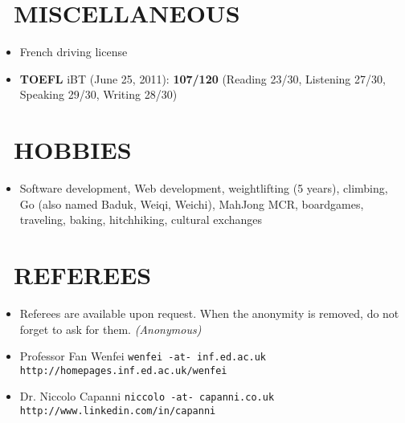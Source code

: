 \documentclass{res}
\begin{document}
\begin{resume}
\section{\faMagic~MISCELLANEOUS}
        \begin{itemize}
                \item[] French driving license
                \item[] \textbf{TOEFL} iBT (June 25, 2011): \textbf{107/120} (Reading 23/30, Listening 27/30, Speaking 29/30, Writing 28/30)
                    \end{itemize} 
 
\section{\faGamepad~HOBBIES}
        \begin{itemize}
                \item[] Software development, Web development, weightlifting (5 years), climbing, Go (also named Baduk, Weiqi, Weichi), MahJong MCR, boardgames, traveling, baking, hitchhiking, cultural exchanges
        \end{itemize}

\section{\faUserCheck~REFEREES}
\ifisanon 
     \begin{itemize}
         \item[] Referees are available upon request. When the anonymity is removed, do not forget to ask for them. \textit{(Anonymous)}
     \end{itemize}
\else
                \begin{itemize}
                        \item[] Professor Fan Wenfei \tabto{5cm} \texttt{wenfei -at- inf.ed.ac.uk} \hfill \texttt{http://homepages.inf.ed.ac.uk/wenfei}
                        \item[] Dr. Niccolo Capanni \tabto{5cm} \texttt{niccolo -at- capanni.co.uk} \hfill \texttt{http://www.linkedin.com/in/capanni}
                \end{itemize}
\fi
\end{resume} 
\end{document}
